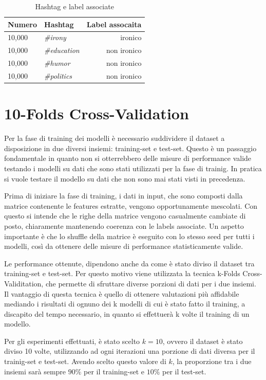 \documentclass[oneside]{book}
\begin{document}
\begin{table}[ht]
	\centering
	\begin{tabular}[t]{llr}
		\hline
		\textbf{Numero} & \textbf{Hashtag}  & \textbf{Label assocaita}\\
		\hline
		10,000 & \emph{\#irony}     & ironico     \\
		10,000 & \emph{\#education} & non ironico \\
		10,000 & \emph{\#humor}     & non ironico \\
		10,000 & \emph{\#politics}  & non ironico \\
		\hline
	\end{tabular}
	\caption{Hashtag e label associate}
\end{table}%

\section{10-Folds Cross-Validation}
Per la fase di training dei modelli è necessario suddividere il dataset a disposizione in due diversi insiemi: training-set e test-set. Questo è un passaggio fondamentale in quanto non si otterrebbero delle misure di performance valide testando i modelli su dati che sono stati utilizzati per la fase di trainig. In pratica si vuole testare il modello su dati che non sono mai stati visti in precedenza.

Prima di iniziare la fase di training, i dati in input, che sono composti dalla matrice contenente le features estratte, vengono opportunamente mescolati. Con questo si intende che le righe della matrice vengono casualmente cambiate di posto, chiaramente mantenendo coerenza con le labels associate. Un aspetto importante è che lo shuffle della matrice è eseguito con lo stesso seed per tutti i modelli, così da ottenere delle misure di performance statisticamente valide.

Le performance ottenute, dipendono anche da come è stato diviso il dataset tra training-set e test-set. Per questo motivo viene utilizzata la tecnica k-Folds Cross-Validitation, che permette di sfruttare diverse porzioni di dati per i due insiemi. Il vantaggio di questa tecnica è quello di ottenere valutazioni più affidabile mediando i risultati di ognuno dei k modelli di cui è stato fatto il training, a discapito del tempo necessario, in quanto si effettuerà k volte il training di un modello.

Per gli esperimenti effettuati, è stato scelto $k=10$, ovvero il dataset è stato diviso 10 volte, utilizzando ad ogni iterazioni una porzione di dati diversa per il trainig-set e test-set. Avendo scelto questo valore di $k$, la proporzione tra i due insiemi sarà sempre $90\%$ per il training-set e $10\%$ per il test-set.
\end{document}
